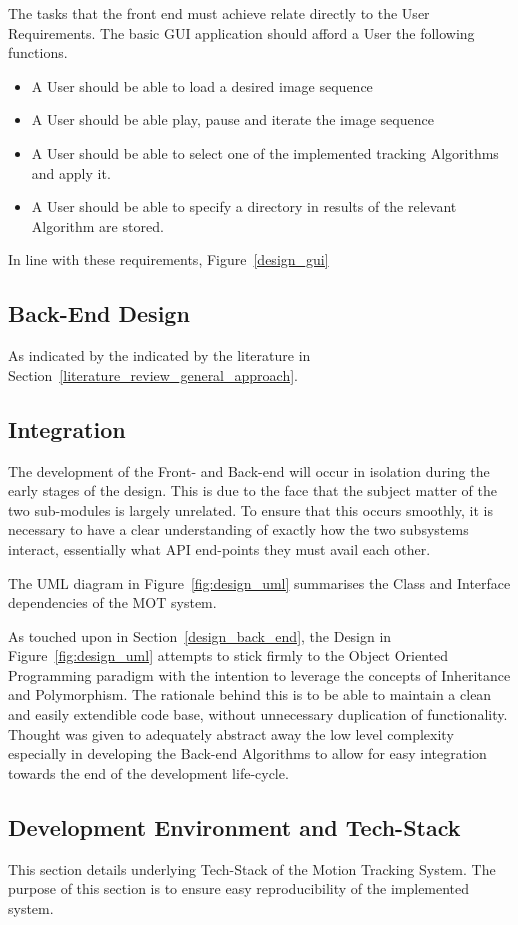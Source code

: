 The tasks that the front end must achieve relate directly to the User
Requirements. The basic GUI application should afford a User the following functions.
\begin{itemize}
    \item A User should be able to load a desired image sequence
    \item A User should be able play, pause and iterate the image sequence 
    \item A User should be able to select one of the implemented tracking
        Algorithms and apply it.
    \item A User should be able to specify a directory in results of the
        relevant Algorithm are stored.
\end{itemize}

In line with these requirements, Figure~\ref{design_gui}


\subsection{Back-End Design}
As indicated by the indicated by the literature in
Section~\ref{literature_review_general_approach}. 

\subsection{Integration}
The development of the Front- and Back-end will occur in isolation during the
early stages of the design. This is due to the face that the subject matter of
the two sub-modules is largely unrelated.  To ensure that this occurs smoothly,
it is necessary to have a clear understanding of exactly how the two subsystems
interact, essentially what API end-points they must avail each other.

The UML diagram in Figure~\ref{fig:design_uml} summarises the Class and Interface dependencies of the
MOT system.

\newpage
{} 
\newpage

As touched upon in Section~\ref{design_back_end}, the Design in
Figure~\ref{fig:design_uml} attempts to stick firmly to the Object Oriented
Programming paradigm with the intention to leverage the concepts of Inheritance and
Polymorphism. The rationale behind this is to be able to maintain a clean and
easily extendible code base, without unnecessary duplication of functionality.
Thought was given to adequately abstract away the low level complexity
especially in developing the Back-end Algorithms to allow for easy integration
towards the end of the development life-cycle. 

\subsection{Development Environment and Tech-Stack}
This section details underlying Tech-Stack of the Motion Tracking System. The
purpose of this section is to ensure easy reproducibility of the implemented
system.


